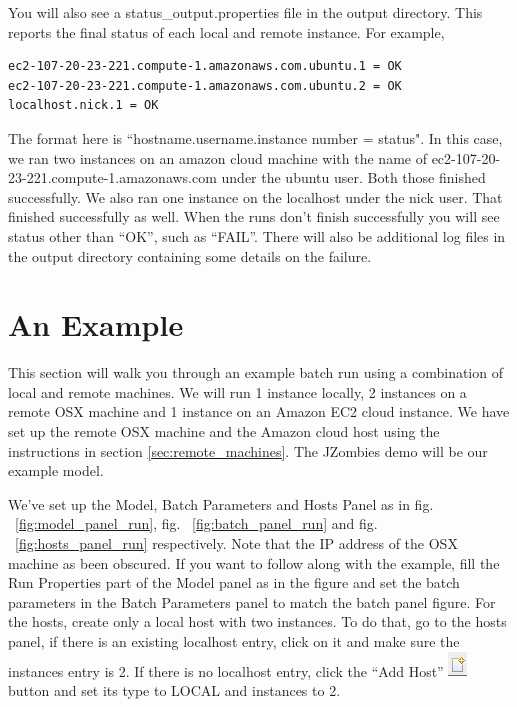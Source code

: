 \documentclass[11pt]{amsart}
\begin{document}
You will also see a status\_output.properties file in the output directory. This reports the final status of each local and remote instance. For example,

\begin{verbatim}
ec2-107-20-23-221.compute-1.amazonaws.com.ubuntu.1 = OK
ec2-107-20-23-221.compute-1.amazonaws.com.ubuntu.2 = OK
localhost.nick.1 = OK
\end{verbatim}
\noindent
The format here is ``hostname.username.instance number = status".  In this case, we ran two instances on an amazon cloud machine with the name of ec2-107-20-23-221.compute-1.amazonaws.com under the ubuntu user. Both those finished successfully. We also ran one instance on the localhost under the nick user. That finished successfully as well. When the runs don't finish successfully you will see status other than ``OK'', such as ``FAIL''. There will also be additional log files in the output directory containing some details on the failure.


\section{An Example}
\label{sec:example}

This section will walk you through an example batch run using a combination of local and remote machines. We will run 1 instance locally, 2 instances on a remote OSX machine and 1 instance on an Amazon EC2 cloud instance. We have set up the remote OSX machine and the Amazon cloud host using the instructions in section \ref{sec:remote_machines}. The JZombies demo will be our example model.

We've set up the Model, Batch Parameters and Hosts Panel as in fig. ~\ref{fig:model_panel_run}, fig. ~\ref{fig:batch_panel_run} and fig. ~\ref{fig:hosts_panel_run} respectively. Note that the IP address of the OSX machine as been obscured. If you want to follow along with the example, fill the Run Properties part of the Model panel as in the figure and set the batch parameters in the Batch Parameters panel to match the batch panel figure. For the hosts, create only a local host with two instances. To do that, go to the hosts panel, if there is an existing localhost entry, click on it and make sure the instances entry is 2. If there is no localhost entry, click the ``Add Host'' \includegraphics[height=.2in]{images/add_host.png} button and set its type to LOCAL and instances to 2.
\end{document}
